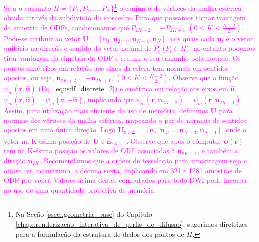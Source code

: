 \documentclass[
    12pt,                %
    oneside,            %
    a4paper,            %
    english,            %
    french,                %
    spanish,            %
    brazil                %
    ]{abntex2}
\begin{document}
\textcolor{magenta}{
Seja o conjunto $\Pi = \{P_1, P_2, \dots, P_N\}$\footnote{Na Seção \ref{ssec::geometria_base} do Capítulo \ref{chap::renderizacao_interativa_de_perfis_de_difusao}, sugerimos diretrizes para a formulação da estrutura de dados dos pontos de $\Pi$.} o conjunto de vértices da malha esférica obtida através da subdivisão do icosaedro. Para que possamos tomar vantagem da simetria de ODFs, condicionamos que $P_{2K+2} = -P_{2K+1}$ $(0 \leq K \leq \frac{N-2}{2})$.
}
\textcolor{magenta}{
Pode-se atribuir ao vetor $\mathbf{U} = [
\mathbf{n}_1, 
\mathbf{n}_2, ...,
\mathbf{n}_{N-1},
\mathbf{n}_N
]$, nos quais cada $\mathbf{n}_i$ é o vetor unitário na direção e sentido do vetor normal de $P_i$ ($P_i \in \Pi$), no entanto podemos tirar vantagem da simetria da ODF e reduzir o seu tamanho pela metade. Os pontos simétricos em relação aos eixos da esfera tem normais em sentidos opostos, ou seja, $\mathbf{n}_{2K+2} = -\mathbf{n}_{2K+1}$, $(0 \leq K \leq \frac{N-2}{2})$. Observe que a função $\psi_m(\mathbf{r}, \mathbf{\hat{u}})$ (Eq. \ref{eq::sdf_discrete_2}) é simétrica em relação aos eixos em $\mathbf{\hat{u}}$, $\psi_m(\mathbf{r}, \mathbf{\hat{u}}) = \psi_m(\mathbf{r}, \mathbf{-\hat{u}})$, implicando que $\psi_m(\mathbf{r}, \mathbf{n}_{2K+2}) = \psi_m(\mathbf{r}, \mathbf{n}_{2K+1})$.
}
\textcolor{magenta}{
Assim, para utilização mais eficiente do uso de memória, definimos $\mathbf{U}$ para normais dos vértices da malha esférica, mapeando o par de normais de sentidos opostos em uma única direção. Logo $\mathbf{U}_{3\times \frac{N}{2}} = [
\mathbf{n}_1,
\mathbf{n}_3, ..., 
\mathbf{n}_{N-3},
\mathbf{n}_{N-1}
]$, onde o vetor na K-ésima  posição de $\mathbf{U}$ é $\mathbf{\hat{n}}_{2K-1}$. Observe que após o cômputo, $\boldsymbol{\psi}(\mathbf{r})$ tem na K-ésima posição os valores de ODF associadas à $\mathbf{n}_{2K-1}$, e também a direção $\mathbf{n}_{2K}$.
}
\textcolor{magenta}{
Recomendamos que a ordem de tesselação para amostragem seja a oitava ou, no máximo, a décima sexta, implicando em 321 e 1281 amostras de ODF por \textit{voxel}. Valores acima destes computados para todo DWI pode incorrer no uso de uma quantidade proibitiva de memória.
}



\end{document}
